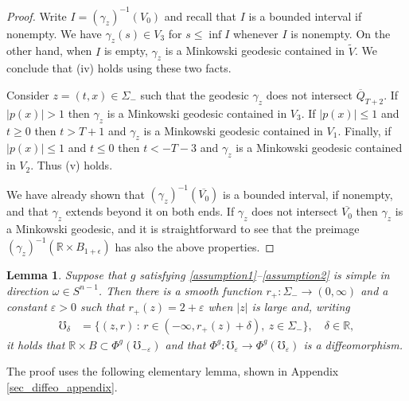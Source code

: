 \documentclass[11pt,letterpaper]{amsart}
\newtheorem{Lemma}[Theorem]{Lemma}
\theoremstyle{definition}
\numberwithin{equation}{section}
\newcommand{\ol}[1]{\overline{#1}}
\newcommand{\eps}{\varepsilon}
\def\R{\mathbb R}
\def\mid{\,:\,}
\begin{document}
\begin{proof}
Write $I = (\gamma_z)^{-1}(V_0)$ and recall that $I$ is a bounded interval if nonempty. We have $\gamma_z(s) \in V_3$ for $s \le \inf I$ whenever $I$ is nonempty. On the other hand, when $I$ is empty, $\gamma_z$ is a Minkowski geodesic contained in $\tilde V$. We conclude that (iv) holds using these two facts. 

Consider $z = (t,x) \in \Sigma_-$ such that the geodesic $\gamma_z$ does not intersect $\ol Q_{T+2}$. If $|p(x)| > 1$ then $\gamma_z$ is a Minkowski geodesic contained in $V_3$. If $|p(x)| \le 1$ and $t \ge 0$ then $t > T + 1$ and $\gamma_z$ is a Minkowski geodesic contained in $V_1$. Finally, if $|p(x)| \le 1$ and $t \le 0$ then $t < -T - 3$ and $\gamma_z$ is a Minkowski geodesic contained in $V_2$. Thus (v) holds.

We have already shown that $(\gamma_z)^{-1}(\overline{V_0})$ is a bounded interval, if nonempty, and that $\gamma_z$ extends beyond it on both ends.
If $\gamma_z$ does not intersect $\overline{V_0}$ then $\gamma_z$ is a Minkowski geodesic, and it is straightforward to see that the preimage $(\gamma_z)^{-1}(\R \times B_{1+\epsilon})$ has also the above properties.
\end{proof}


\begin{Lemma}\label{lem_r_plus}
Suppose that $g$ satisfying \eqref{assumption1}--\eqref{assumption2} is simple in direction $\omega \in S^{n-1}$. Then there is a smooth function $r_+ : \Sigma_- \to (0, \infty)$ and a constant $\eps > 0$ such that $r_+(z) = 2 + \eps$ when $|z|$ is large and, writing
    \begin{align*}
\mho_\delta &= \{(z, r) \mid r \in (-\infty, r_+(z) + \delta),\ z \in \Sigma_- \}, \quad \delta \in \R, 
    \end{align*}
it holds that $\R \times B \subset \Phi^g(\mho_{-\eps})$ and that
$\Phi^g : \mho_\eps \to \Phi^g(\mho_\eps)$ is a diffeomorphism.
\end{Lemma}

The proof uses the following elementary lemma, shown in Appendix \ref{sec_diffeo_appendix}. 
\end{document}
